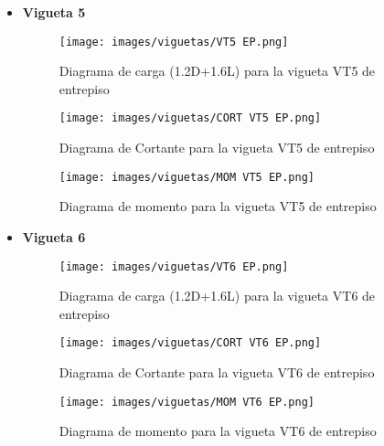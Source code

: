 \begin{itemize}
            
            \item \textbf{Vigueta 5}\\
            \begin{figure}[H]
                \centering
                \texttt{[image: images/viguetas/VT5 EP.png]} 
                \caption{Diagrama de carga (1.2D+1.6L) para la vigueta VT5 de entrepiso}
                \label{fig:W VT5 EP}
            \end{figure}
            
            \begin{figure}[H]
                \centering
                \texttt{[image: images/viguetas/CORT VT5 EP.png]} 
                \caption{Diagrama de Cortante para la vigueta VT5 de entrepiso}
                \label{fig:v VT5 EP}
            \end{figure}
            
             \begin{figure}[H]
                \centering
                \texttt{[image: images/viguetas/MOM VT5 EP.png]} 
                \caption{Diagrama de momento para la vigueta VT5 de entrepiso}
                \label{fig:M VT5 EP}
            \end{figure}
            
            \item \textbf{Vigueta 6}\\
            \begin{figure}[H]
                \centering
                \texttt{[image: images/viguetas/VT6 EP.png]} 
                \caption{Diagrama de carga (1.2D+1.6L) para la vigueta VT6 de entrepiso}
                \label{fig:W VT6 EP}
            \end{figure}
            
            \begin{figure}[H]
                \centering
                \texttt{[image: images/viguetas/CORT VT6 EP.png]} 
                \caption{Diagrama de Cortante para la vigueta VT6 de entrepiso}
                \label{fig:v VT6 EP}
            \end{figure}
            
             \begin{figure}[H]
                \centering
                \texttt{[image: images/viguetas/MOM VT6 EP.png]} 
                \caption{Diagrama de momento para la vigueta VT6 de entrepiso}
                \label{fig:M VT6 EP}
            \end{figure}
            

\end{itemize}
